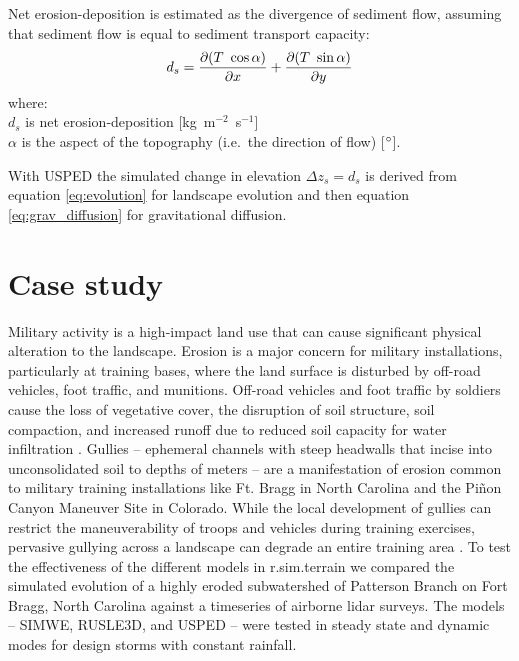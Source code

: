 \documentclass[gmd, manuscript]{copernicus}
\begin{document}
\noindent
Net erosion-deposition is estimated as the divergence of sediment flow, 
assuming that sediment flow is equal to sediment transport capacity: 
\begin{equation}\label{eq:usped_erdep} 
d_s = 
{\partial (T ~ \cos \alpha) \over \partial x} +
{\partial (T ~ \sin \alpha) \over \partial y}
\end{equation}
{\small
\noindent
where: \\
\hspace*{0.5em} $d_s$ is net erosion-deposition [\unit{kg~m}$^{-2}$~\unit{s}$^{-1}$]\\
\hspace*{0.5em} $\alpha$ is the aspect of the topography (i.e.~the direction of flow) [$^{\circ}$].\\
}

\noindent
With USPED the simulated change in elevation $\Delta z_s=d_s$
is derived from equation \ref{eq:evolution} for landscape evolution
and then equation \ref{eq:grav_diffusion}
for gravitational diffusion.


\section{Case study} 

Military activity is a high-impact land use 
that can cause significant physical alteration to the landscape. 
Erosion is a major concern for military installations, 
particularly at training bases, 
where the land surface is disturbed by 
off-road vehicles, foot traffic, and munitions. 
Off-road vehicles and foot traffic by soldiers 
cause the loss of vegetative cover, 
the disruption of soil structure, soil compaction, 
and increased runoff due to 
reduced soil capacity for water infiltration 
\citep{Webb1983, McDonald2004}.
Gullies -- ephemeral channels with steep headwalls 
that incise into unconsolidated soil to depths of meters -- 
are a manifestation of erosion common to 
military training installations like Ft. Bragg in North Carolina 
and the Pi\~{n}on Canyon Maneuver Site in Colorado. 
While the local development of gullies can restrict 
the maneuverability of troops and vehicles during training exercises, 
pervasive gullying across a landscape 
can degrade an entire training area 
\citep{Huang2014}.
%
To test the effectiveness of the different models 
in r.sim.terrain
we compared the simulated evolution
of a highly eroded subwatershed 
of Patterson Branch on Fort Bragg, North Carolina
against a timeseries of airborne lidar surveys.
The models -- SIMWE, RUSLE3D, and USPED --
were tested in steady state and dynamic modes
for design storms with constant rainfall.
\end{document}

